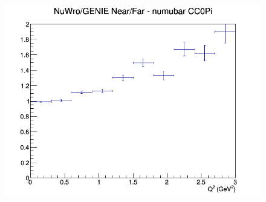 \begin{figure}[h]
\endminipage
{}
\includegraphics[width=\linewidth]{eff_Q2/GAr/ratios/CC0Pi_NuWro_GENIE_numubar_NF_Q2.png}
\endminipage
\newline
\end{figure}
\clearpage
